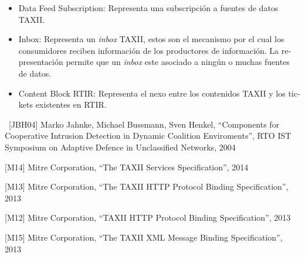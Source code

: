 \documentclass[11pt]{article}
\begin{document}
\begin{itemize}
{dichas fuentes de información para recibir datos que sean de su interés. }
\item \foreignlanguage{spanish}{Data Feed Subscription: Representa una subscripción a fuentes de datos TAXII.}
\item \foreignlanguage{spanish}{Inbox: Representa un }\foreignlanguage{spanish}{\textit{inbox
}}\foreignlanguage{spanish}{TAXII, estos son el mecanismo por el cual los consumidores reciben información de los
productores de información. La representación permite que un
}\foreignlanguage{spanish}{\textit{inbox}}\foreignlanguage{spanish}{ este asociado a ningún o muchas fuentes de datos.
}
\item \foreignlanguage{spanish}{Content Block RTIR: Representa el nexo entre los contenidos TAXII y los tickets
existentes en RTIR.}
\end{itemize}

\bigskip


\bigskip


\bigskip


\bigskip
\newpage
\foreignlanguage{spanish}{\ [JBH04] Marko Jahnke, Michael Bussmann, Sven Henkel, ``Components for Cooperative Intrusion
Detection in Dynamic Coalition Enviroments'', RTO IST Symposium on Adaptive Defence in Unclassified Networks, 2004}


\bigskip

\foreignlanguage{spanish}{[M14] Mitre Corporation, ``The TAXII Services Specification'', 2014}


\bigskip

\foreignlanguage{spanish}{[M13] Mitre Corporation, ``The TAXII HTTP Protocol Binding Specification'', 2013}


\bigskip

\foreignlanguage{spanish}{[M12] Mitre Corporation, ``}TAXII HTTP Protocol Binding Specification'', 2013


\bigskip

\foreignlanguage{spanish}{[M15] Mitre Corporation, ``The TAXII XML Message Binding Specification'', 2013}


\bigskip
\end{document}

